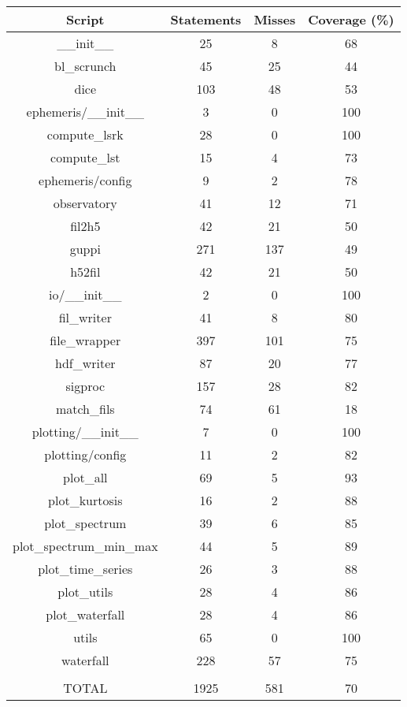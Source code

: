 \documentclass[12pt]{article}
\begin{document}
\begin{center}
 \begin{tabular}{||c c c c||} 
 \hline
 Script & Statements & Misses & Coverage (\%)\\ [0.5ex] 
 \hline
\_\_init\_\_ & 25 & 8 & 68 \\
\hline
bl\_scrunch & 45 & 25 & 44 \\
\hline
dice & 103 & 48 & 53 \\
\hline
ephemeris/\_\_init\_\_ & 3 & 0 & 100 \\
\hline
compute\_lsrk & 28 & 0 & 100 \\
\hline
compute\_lst & 15 & 4 & 73 \\
\hline
ephemeris/config & 9 & 2 & 78 \\
\hline
observatory & 41 & 12 & 71 \\
\hline
fil2h5 & 42 & 21 & 50 \\
\hline
guppi & 271 & 137 & 49 \\
\hline
h52fil & 42 & 21 & 50 \\
\hline
io/\_\_init\_\_ & 2 & 0 & 100 \\
\hline
fil\_writer & 41 & 8 & 80 \\
\hline
file\_wrapper & 397 & 101 & 75 \\
\hline
hdf\_writer & 87 & 20 & 77 \\
\hline
sigproc & 157 & 28 & 82 \\
\hline
match\_fils & 74 & 61 & 18 \\
\hline
plotting/\_\_init\_\_ & 7 & 0 & 100 \\
\hline
plotting/config & 11 & 2 & 82 \\
\hline
plot\_all & 69 & 5 & 93 \\
\hline
plot\_kurtosis & 16 & 2 & 88 \\
\hline
plot\_spectrum & 39 & 6 & 85 \\
\hline
plot\_spectrum\_min\_max & 44 & 5 & 89 \\
\hline
plot\_time\_series & 26 & 3 & 88 \\
\hline
plot\_utils & 28 & 4 & 86 \\
\hline
plot\_waterfall & 28 & 4 & 86 \\
\hline
utils & 65 & 0 & 100 \\
\hline
waterfall & 228 & 57 & 75 \\
\hline
&&&
\\
\hline
TOTAL & 1925 & 581 & 70 \\ [1ex] 
\hline
\end{tabular}
\end{center}
\end{document}
